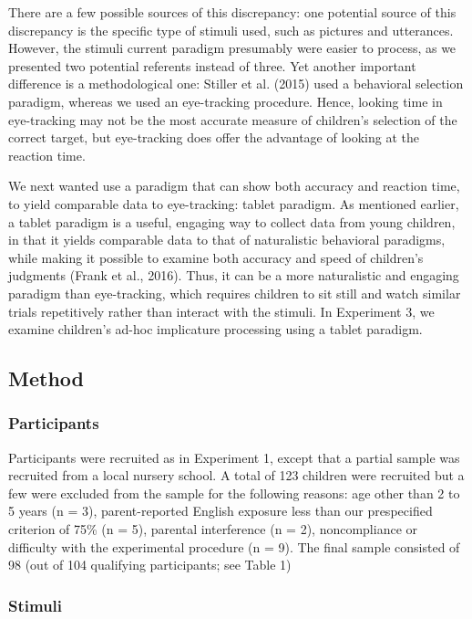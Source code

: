 \documentclass[a4paper,man,apacite,floatsintext]{apa6}
\begin{document}
There are a few possible sources of this discrepancy: one potential
source of this discrepancy is the specific type of stimuli used, such as
pictures and utterances. However, the stimuli current paradigm
presumably were easier to process, as we presented two potential
referents instead of three. Yet another important difference is a
methodological one: Stiller et al. (2015) used a behavioral selection
paradigm, whereas we used an eye-tracking procedure. Hence, looking time
in eye-tracking may not be the most accurate measure of children's
selection of the correct target, but eye-tracking does offer the
advantage of looking at the reaction time.

We next wanted use a paradigm that can show both accuracy and reaction
time, to yield comparable data to eye-tracking: tablet paradigm. As
mentioned earlier, a tablet paradigm is a useful, engaging way to
collect data from young children, in that it yields comparable data to
that of naturalistic behavioral paradigms, while making it possible to
examine both accuracy and speed of children's judgments (Frank et al.,
2016). Thus, it can be a more naturalistic and engaging paradigm than
eye-tracking, which requires children to sit still and watch similar
trials repetitively rather than interact with the stimuli. In Experiment
3, we examine children's ad-hoc implicature processing using a tablet
paradigm.

\subsection{Method}\label{method-2}

\subsubsection{Participants}\label{participants-2}

Participants were recruited as in Experiment 1, except that a partial
sample was recruited from a local nursery school. A total of 123
children were recruited but a few were excluded from the sample for the
following reasons: age other than 2 to 5 years (n = 3), parent-reported
English exposure less than our prespecified criterion of 75\% (n = 5),
parental interference (n = 2), noncompliance or difficulty with the
experimental procedure (n = 9). The final sample consisted of 98 (out of
104 qualifying participants; see Table 1)

\subsubsection{Stimuli}\label{stimuli-1}
\end{document}
